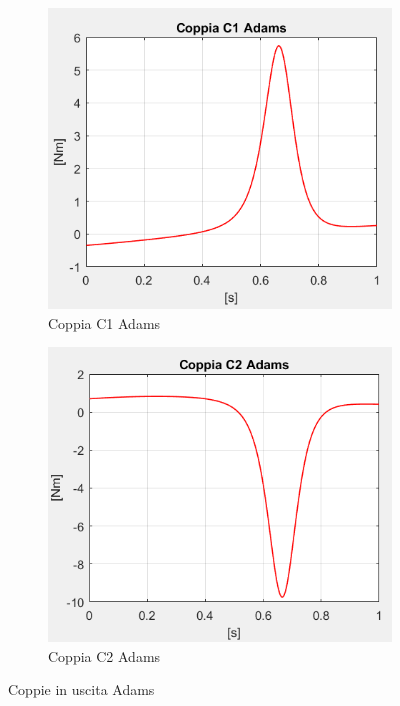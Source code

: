 \begin{figure}[!ht]
	\begin{subfigure}{.45\textwidth}
		\centering
		\includegraphics[width=.9\linewidth]{Immagini/Dinamica/c1adams.png}  
		\caption{Coppia C1 Adams}
		\label{fig:leggiC1A}
	\end{subfigure}
	\begin{subfigure}{.45\textwidth}
		\centering
		\includegraphics[width=.9\linewidth]{Immagini/Dinamica/c2adams.png}  
		\caption{Coppia C2 Adams}
		\label{fig:leggiC2A}
	\end{subfigure}
	\caption{Coppie in uscita Adams}
\end{figure}

